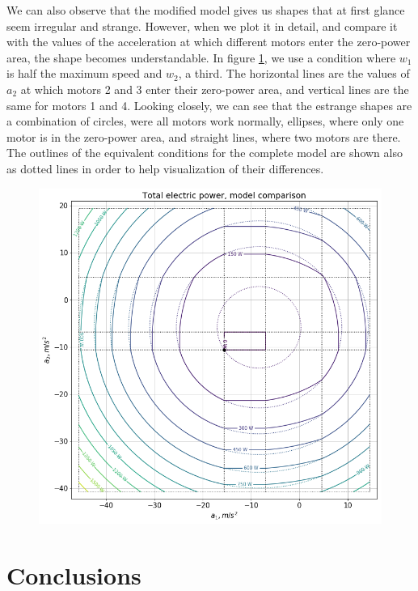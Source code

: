 \documentclass[12pt]{article}
\begin{document}
We can also observe that the modified model gives us shapes that at first glance seem irregular and strange. However, when we plot it in detail, and compare it with the values of the acceleration at which different motors enter the zero-power area, the shape becomes understandable. In figure \ref{fig:comparacion_modelos}, we use a condition where $w_1$ is half the maximum speed and $w_2$, a third. The horizontal lines are the values of $a_2$ at which motors 2 and 3 enter their zero-power area, and vertical lines are the same for motors 1 and 4. Looking closely, we can see that the estrange shapes are a combination of circles, were all motors work normally, ellipses, where only one motor is in the zero-power area, and straight lines, where two motors are there. The outlines of the equivalent conditions for the complete model are shown also as dotted lines in order to help visualization of their differences.

\begin{figure}[h]
	\centering
	\includegraphics[width=1\linewidth]{comparacion_modelos}
	\label{fig:comparacion_modelos}
\end{figure}

\section*{Conclusions}
\end{document}
